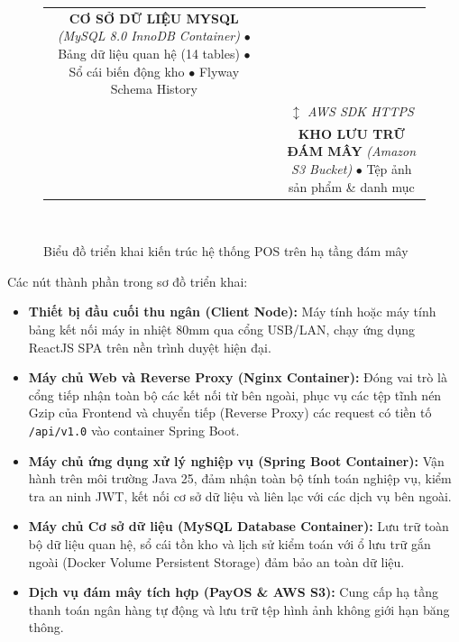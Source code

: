\begin{figure}[H]
\begin{minipage}{0.95\textwidth}
{{\begin{tabularx}{\textwidth}{ccc}
            \fbox{\parbox{4.5cm}{\centering \textbf{CƠ SỞ DỮ LIỆU MYSQL}\\
            \textit{(MySQL 8.0 InnoDB Container)}\\
            $\bullet$ Bảng dữ liệu quan hệ (14 tables)\\
            $\bullet$ Sổ cái biến động kho\\
            $\bullet$ Flyway Schema History}} \\[5mm]
            & & $\updownarrow$ \textit{AWS SDK HTTPS}\\[2mm]
            & & \fbox{\parbox{4.5cm}{\centering \textbf{KHO LƯU TRỮ ĐÁM MÂY}\\
            \textit{(Amazon S3 Bucket)}\\
            $\bullet$ Tệp ảnh sản phẩm \& danh mục}}
        \end{tabularx}\\[2mm]
    }
}
\end{minipage}
\caption{Biểu đồ triển khai kiến trúc hệ thống POS trên hạ tầng đám mây}
\label{fig:deployment_diagram}
\end{figure}

Các nút thành phần trong sơ đồ triển khai:
\begin{itemize}[leftmargin=1.5cm]
    \item \textbf{Thiết bị đầu cuối thu ngân (Client Node):} Máy tính hoặc máy tính bảng kết nối máy in nhiệt 80mm qua cổng USB/LAN, chạy ứng dụng ReactJS SPA trên nền trình duyệt hiện đại.
    \item \textbf{Máy chủ Web và Reverse Proxy (Nginx Container):} Đóng vai trò là cổng tiếp nhận toàn bộ các kết nối từ bên ngoài, phục vụ các tệp tĩnh nén Gzip của Frontend và chuyển tiếp (Reverse Proxy) các request có tiền tố \texttt{/api/v1.0} vào container Spring Boot.
    \item \textbf{Máy chủ ứng dụng xử lý nghiệp vụ (Spring Boot Container):} Vận hành trên môi trường Java 25, đảm nhận toàn bộ tính toán nghiệp vụ, kiểm tra an ninh JWT, kết nối cơ sở dữ liệu và liên lạc với các dịch vụ bên ngoài.
    \item \textbf{Máy chủ Cơ sở dữ liệu (MySQL Database Container):} Lưu trữ toàn bộ dữ liệu quan hệ, sổ cái tồn kho và lịch sử kiểm toán với ổ lưu trữ gắn ngoài (Docker Volume Persistent Storage) đảm bảo an toàn dữ liệu.
    \item \textbf{Dịch vụ đám mây tích hợp (PayOS \& AWS S3):} Cung cấp hạ tầng thanh toán ngân hàng tự động và lưu trữ tệp hình ảnh không giới hạn băng thông.
\end{itemize}


